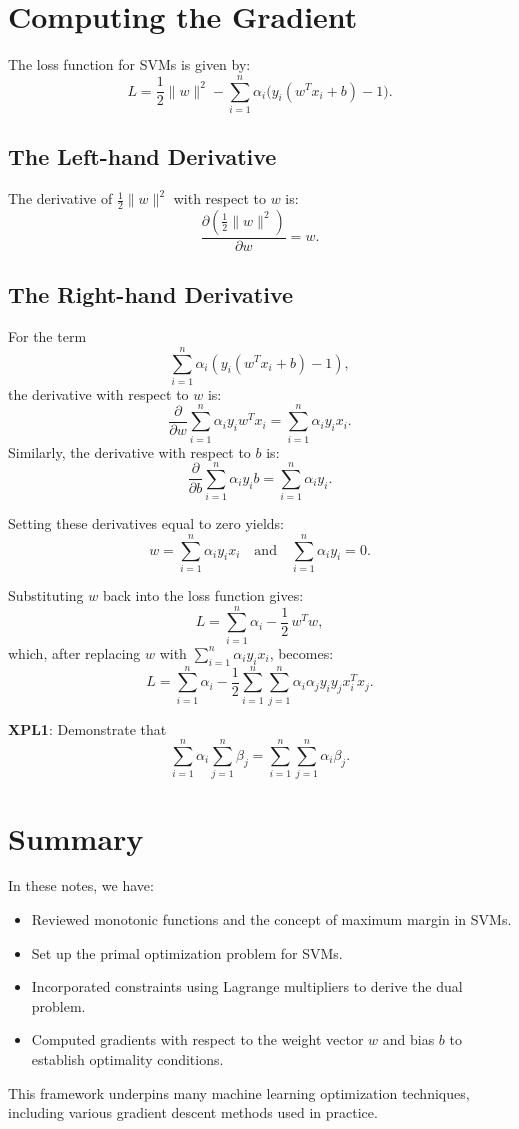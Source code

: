 \section{Computing the Gradient}

The loss function for SVMs is given by:
\[
L = \frac{1}{2}\|w\|^2 - \sum_{i=1}^{n} \alpha_i \bigl( y_i (w^T x_i + b) - 1 \bigr).
\]

\subsection{The Left-hand Derivative}
The derivative of \(\frac{1}{2}\|w\|^2\) with respect to \(w\) is:
\[
\frac{\partial \left(\frac{1}{2}\|w\|^2\right)}{\partial w} = w.
\]

\subsection{The Right-hand Derivative}
For the term 
\[
\sum_{i=1}^{n} \alpha_i (y_i(w^T x_i + b) - 1),
\]
the derivative with respect to \(w\) is:
\[
\frac{\partial}{\partial w} \sum_{i=1}^{n} \alpha_i y_i w^T x_i = \sum_{i=1}^{n} \alpha_i y_i x_i.
\]
Similarly, the derivative with respect to \(b\) is:
\[
\frac{\partial}{\partial b} \sum_{i=1}^{n} \alpha_i y_i b = \sum_{i=1}^{n} \alpha_i y_i.
\]

Setting these derivatives equal to zero yields:
\[
w = \sum_{i=1}^{n} \alpha_i y_i x_i \quad \text{and} \quad \sum_{i=1}^{n} \alpha_i y_i = 0.
\]

Substituting \(w\) back into the loss function gives:
\[
L = \sum_{i=1}^{n} \alpha_i - \frac{1}{2}\, w^T w,
\]
which, after replacing \(w\) with \(\sum_{i=1}^{n} \alpha_i y_i x_i\), becomes:
\[
L = \sum_{i=1}^{n} \alpha_i - \frac{1}{2} \sum_{i=1}^{n} \sum_{j=1}^{n} \alpha_i \alpha_j y_i y_j x_i^T x_j.
\]

\begin{tcolorbox}
\textbf{XPL1}: Demonstrate that 
\[
\sum_{i=1}^n \alpha_i \sum_{j=1}^n \beta_j = \sum_{i=1}^n \sum_{j=1}^n \alpha_i\beta_j.
\]
\end{tcolorbox}

\section{Summary}
In these notes, we have:
\begin{itemize}
    \item Reviewed monotonic functions and the concept of maximum margin in SVMs.
    \item Set up the primal optimization problem for SVMs.
    \item Incorporated constraints using Lagrange multipliers to derive the dual problem.
    \item Computed gradients with respect to the weight vector \(w\) and bias \(b\) to establish optimality conditions.
\end{itemize}

This framework underpins many machine learning optimization techniques, including various gradient descent methods used in practice.

